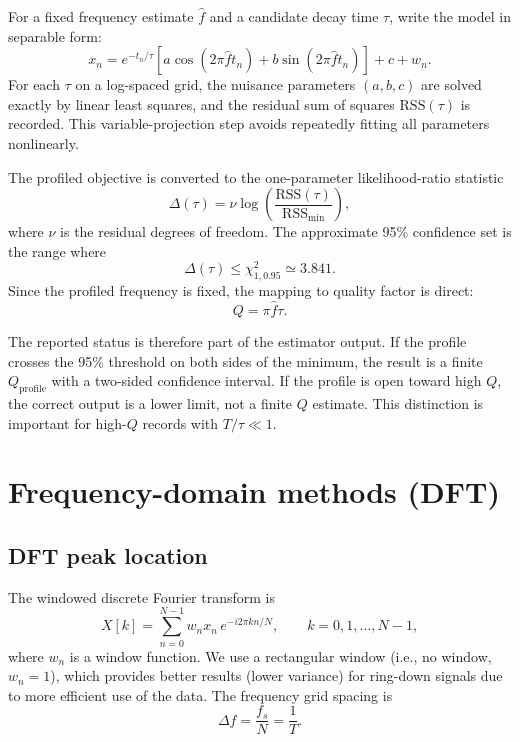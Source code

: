 \documentclass[11pt]{article}
\begin{document}
For a fixed frequency estimate $\hat f$ and a candidate decay time $\tau$, write the model in separable form:
\begin{equation}
x_n = e^{-t_n/\tau}\left[a\cos(2\pi \hat f t_n) + b\sin(2\pi \hat f t_n)\right] + c + w_n.
\end{equation}
For each $\tau$ on a log-spaced grid, the nuisance parameters $(a,b,c)$ are solved exactly by linear least squares, and the residual sum of squares $\mathrm{RSS}(\tau)$ is recorded. This variable-projection step avoids repeatedly fitting all parameters nonlinearly.

The profiled objective is converted to the one-parameter likelihood-ratio statistic
\begin{equation}
\Delta(\tau) = \nu\log\left(\frac{\mathrm{RSS}(\tau)}{\mathrm{RSS}_{\min}}\right),
\end{equation}
where $\nu$ is the residual degrees of freedom. The approximate 95\% confidence set is the range where
\begin{equation}
\Delta(\tau) \le \chi^2_{1,0.95} \simeq 3.841.
\end{equation}
Since the profiled frequency is fixed, the mapping to quality factor is direct:
\begin{equation}
Q = \pi \hat f \tau.
\end{equation}

The reported status is therefore part of the estimator output. If the profile crosses the 95\% threshold on both sides of the minimum, the result is a finite $Q_{\mathrm{profile}}$ with a two-sided confidence interval. If the profile is open toward high $Q$, the correct output is a lower limit, not a finite $Q$ estimate. This distinction is important for high-$Q$ records with $T/\tau \ll 1$.

\section{Frequency-domain methods (DFT)}
\label{sec:dft}

\subsection{DFT peak location}

The windowed discrete Fourier transform is
\begin{equation}
X[k] = \sum_{n=0}^{N-1} w_n x_n\,e^{-i 2\pi kn/N},\qquad k=0,1,\dots,N-1,
\end{equation}
where $w_n$ is a window function. We use a rectangular window (i.e., no window, $w_n = 1$), which provides better results (lower variance) for ring-down signals due to more efficient use of the data. The frequency grid spacing is
\begin{equation}
\Delta f = \frac{f_s}{N} = \frac{1}{T}.
\end{equation}
\end{document}
